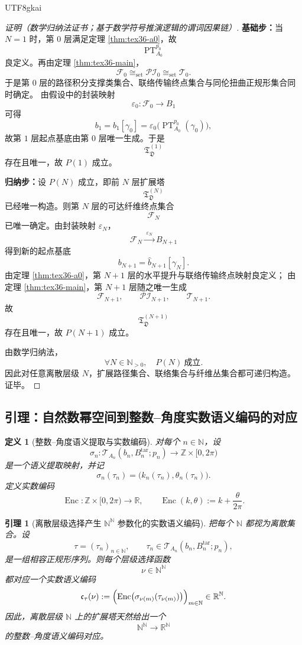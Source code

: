 \documentclass[12pt]{article}
\newtheorem{definition}{定义}[section]
\newtheorem{lemma}{引理}[section]
\newcommand{\NN}{\mathbb{N}}
\newcommand{\RR}{\mathbb{R}}
\newcommand{\ZZ}{\mathbb{Z}}
\newcommand{\PT}{\operatorname{PT}}
\newcommand{\Enc}{\operatorname{Enc}}
\begin{document}
\begin{CJK*}{UTF8}{gkai}
\begin{proof}[证明（数学归纳法证书；基于数学符号推演逻辑的谓词因果链）]
\textbf{基础步：}当 $N=1$ 时，第 $0$ 层满足定理 \ref{thm:tex36-a0}，故
\[
  \PT_{A_0}^{p_0}
\]
良定义。再由定理 \ref{thm:tex36-main}，
\[
  \mathcal{F}_0
  \cong_{\mathrm{set}}
  \mathcal{PI}_0
  \cong_{\mathrm{set}}
  \mathcal{T}_0.
\]
于是第 $0$ 层的路径积分支撑类集合、联络传输终点集合与同伦扭曲正规形集合同时确定。
由假设中的封装映射
\[
  \varepsilon_0:\mathcal{F}_0\to B_1
\]
可得
\[
  b_1=\widehat{b}_1[\gamma_0]
  =
  \varepsilon_0\bigl(\PT_{A_0}^{p_0}(\gamma_0)\bigr),
\]
故第 $1$ 层起点基底由第 $0$ 层唯一生成。于是
\[
  \mathfrak T_{\mathfrak D}^{(1)}
\]
存在且唯一，故 $P(1)$ 成立。

\textbf{归纳步：}设 $P(N)$ 成立，即前 $N$ 层扩展塔
\[
  \mathfrak T_{\mathfrak D}^{(N)}
\]
已经唯一构造。则第 $N$ 层的可达纤维终点集合
\[
  \mathcal{F}_N
\]
已唯一确定。由封装映射 $\varepsilon_N$，
\[
  \mathcal{F}_N
  \xrightarrow{\ \varepsilon_N\ }
  B_{N+1}
\]
得到新的起点基底
\[
  b_{N+1}
  =
  \widehat{b}_{N+1}[\gamma_N].
\]
由定理 \ref{thm:tex36-a0}，第 $N+1$ 层的水平提升与联络传输终点映射良定义；
由定理 \ref{thm:tex36-main}，第 $N+1$ 层随之唯一生成
\[
  \mathcal{F}_{N+1},\qquad
  \mathcal{PI}_{N+1},\qquad
  \mathcal{T}_{N+1}.
\]
故
\[
  \mathfrak T_{\mathfrak D}^{(N+1)}
\]
存在且唯一，故 $P(N+1)$ 成立。

由数学归纳法，
\[
  \forall N\in\NN_{>0},\quad P(N)\ \text{成立}.
\]
因此对任意离散层级 $N$，扩展路径集合、联络集合与纤维丛集合都可递归构造。证毕。
\end{proof}

\subsection{引理：自然数幂空间到整数--角度实数语义编码的对应}
\label{subsec:tex36-semantic-code}

\begin{definition}[整数--角度语义提取与实数编码]
\label{def:tex36-semantic-code}
对每个 $n\in\NN$，设
\[
  \sigma_n:
  \mathcal{T}_{A_n}(b_n,B_n^{\mathrm{tar}};p_n)\to \ZZ\times [0,2\pi)
\]
是一个语义提取映射，并记
\[
  \sigma_n(\tau_n)=\bigl(k_n(\tau_n),\theta_n(\tau_n)\bigr).
\]
定义实数编码
\[
  \Enc:\ZZ\times [0,2\pi)\to \RR,
  \qquad
  \Enc(k,\theta):=k+\frac{\theta}{2\pi}.
\]
\end{definition}

\begin{lemma}[离散层级选择产生 $\NN^\NN$ 参数化的实数语义编码]
\label{lem:tex36-nn-code}
把每个 $\NN$ 都视为离散集合。设
\[
  \tau=(\tau_n)_{n\in\NN},
  \qquad
  \tau_n\in \mathcal{T}_{A_n}(b_n,B_n^{\mathrm{tar}};p_n),
\]
是一组相容正规形序列。则每个层级选择函数
\[
  \nu\in \NN^\NN
\]
都对应一个实数语义编码
\[
  \mathfrak c_{\tau}(\nu)
  :=
  \Bigl(
    \Enc\bigl(\sigma_{\nu(m)}(\tau_{\nu(m)})\bigr)
  \Bigr)_{m\in\NN}
  \in \RR^\NN.
\]
因此，离散层级 $\NN$ 上的扩展塔天然给出一个
\[
  \NN^\NN \longrightarrow \RR^\NN
\]
的整数--角度语义编码对应。
\end{lemma}


\end{CJK*}
\end{document}
